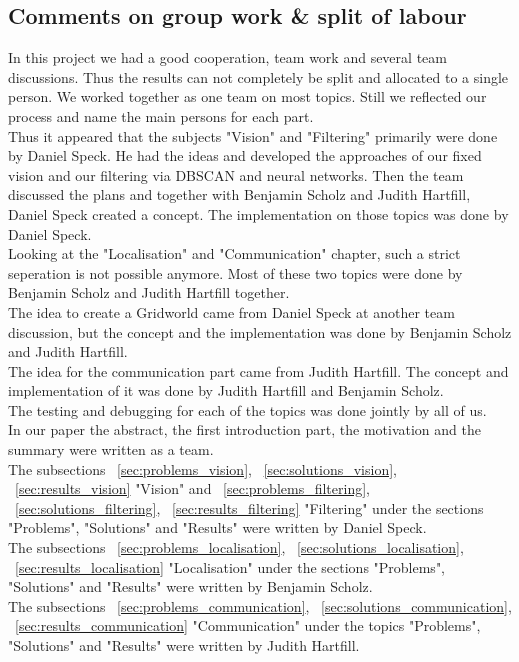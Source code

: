 \documentclass[lnicst,a4paper]{svmultln}
\begin{document}
\subsection{Comments on group work \& split of labour}
In this project we had a good cooperation, team work and several team discussions. Thus the results can not completely be split and allocated to a single person. We worked together as one team on most topics. Still we reflected our process and name the main persons for each part.
\\
Thus it appeared that the subjects "Vision" and "Filtering" primarily were done by Daniel Speck. He had the ideas and developed the approaches of our fixed vision and our filtering via DBSCAN and neural networks. Then the team discussed the plans and together with Benjamin Scholz and Judith Hartfill, Daniel Speck created a concept. The implementation on those topics was done by Daniel Speck.
\\
Looking at the "Localisation" and "Communication" chapter, such a strict seperation is not possible anymore. Most of these two topics were done by Benjamin Scholz and Judith Hartfill together.
\\
The idea to create a Gridworld came from Daniel Speck at another team discussion, but the concept and the implementation was done by Benjamin Scholz and Judith Hartfill.
\\
The idea for the communication part came from Judith Hartfill. The concept and implementation of it was done by Judith Hartfill and Benjamin Scholz.
\\
The testing and debugging for each of the topics was done jointly by all of us.
\\
In our paper the abstract, the first introduction part, the motivation and the summary were written as a team.
\\
The subsections ~\ref{sec:problems_vision}, ~\ref{sec:solutions_vision}, ~\ref{sec:results_vision} "Vision" and ~\ref{sec:problems_filtering}, ~\ref{sec:solutions_filtering}, ~\ref{sec:results_filtering} "Filtering" under the sections "Problems", "Solutions" and "Results" were written by Daniel Speck.
\\
The subsections ~\ref{sec:problems_localisation}, ~\ref{sec:solutions_localisation}, ~\ref{sec:results_localisation} "Localisation" under the sections "Problems", "Solutions" and "Results" were written by Benjamin Scholz.
\\
The subsections ~\ref{sec:problems_communication}, ~\ref{sec:solutions_communication}, ~\ref{sec:results_communication} "Communication" under the topics "Problems", "Solutions" and "Results" were written by Judith Hartfill.
\end{document}
